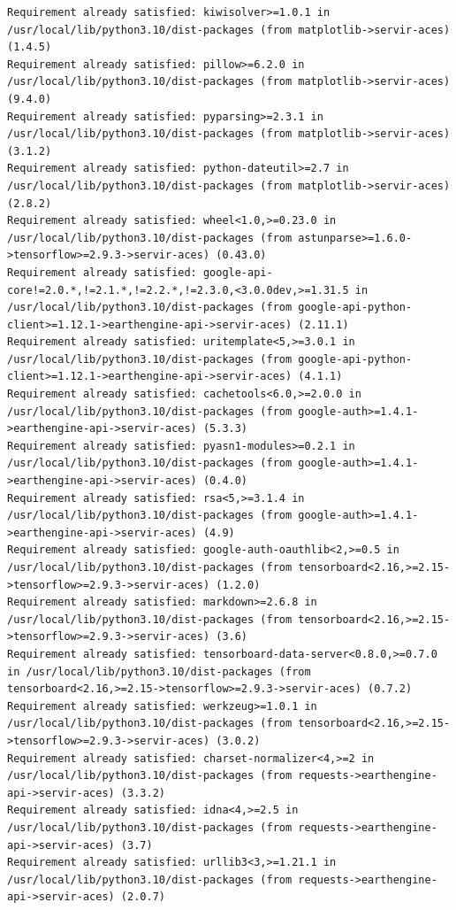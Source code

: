 \documentclass[
  letterpaper,
  DIV=11,
  numbers=noendperiod]{scrreprt}
\begin{document}
\begin{verbatim}
Requirement already satisfied: kiwisolver>=1.0.1 in /usr/local/lib/python3.10/dist-packages (from matplotlib->servir-aces) (1.4.5)
Requirement already satisfied: pillow>=6.2.0 in /usr/local/lib/python3.10/dist-packages (from matplotlib->servir-aces) (9.4.0)
Requirement already satisfied: pyparsing>=2.3.1 in /usr/local/lib/python3.10/dist-packages (from matplotlib->servir-aces) (3.1.2)
Requirement already satisfied: python-dateutil>=2.7 in /usr/local/lib/python3.10/dist-packages (from matplotlib->servir-aces) (2.8.2)
Requirement already satisfied: wheel<1.0,>=0.23.0 in /usr/local/lib/python3.10/dist-packages (from astunparse>=1.6.0->tensorflow>=2.9.3->servir-aces) (0.43.0)
Requirement already satisfied: google-api-core!=2.0.*,!=2.1.*,!=2.2.*,!=2.3.0,<3.0.0dev,>=1.31.5 in /usr/local/lib/python3.10/dist-packages (from google-api-python-client>=1.12.1->earthengine-api->servir-aces) (2.11.1)
Requirement already satisfied: uritemplate<5,>=3.0.1 in /usr/local/lib/python3.10/dist-packages (from google-api-python-client>=1.12.1->earthengine-api->servir-aces) (4.1.1)
Requirement already satisfied: cachetools<6.0,>=2.0.0 in /usr/local/lib/python3.10/dist-packages (from google-auth>=1.4.1->earthengine-api->servir-aces) (5.3.3)
Requirement already satisfied: pyasn1-modules>=0.2.1 in /usr/local/lib/python3.10/dist-packages (from google-auth>=1.4.1->earthengine-api->servir-aces) (0.4.0)
Requirement already satisfied: rsa<5,>=3.1.4 in /usr/local/lib/python3.10/dist-packages (from google-auth>=1.4.1->earthengine-api->servir-aces) (4.9)
Requirement already satisfied: google-auth-oauthlib<2,>=0.5 in /usr/local/lib/python3.10/dist-packages (from tensorboard<2.16,>=2.15->tensorflow>=2.9.3->servir-aces) (1.2.0)
Requirement already satisfied: markdown>=2.6.8 in /usr/local/lib/python3.10/dist-packages (from tensorboard<2.16,>=2.15->tensorflow>=2.9.3->servir-aces) (3.6)
Requirement already satisfied: tensorboard-data-server<0.8.0,>=0.7.0 in /usr/local/lib/python3.10/dist-packages (from tensorboard<2.16,>=2.15->tensorflow>=2.9.3->servir-aces) (0.7.2)
Requirement already satisfied: werkzeug>=1.0.1 in /usr/local/lib/python3.10/dist-packages (from tensorboard<2.16,>=2.15->tensorflow>=2.9.3->servir-aces) (3.0.2)
Requirement already satisfied: charset-normalizer<4,>=2 in /usr/local/lib/python3.10/dist-packages (from requests->earthengine-api->servir-aces) (3.3.2)
Requirement already satisfied: idna<4,>=2.5 in /usr/local/lib/python3.10/dist-packages (from requests->earthengine-api->servir-aces) (3.7)
Requirement already satisfied: urllib3<3,>=1.21.1 in /usr/local/lib/python3.10/dist-packages (from requests->earthengine-api->servir-aces) (2.0.7)

\end{verbatim}
\end{document}
